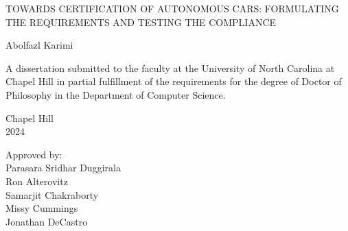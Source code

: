 \begin{titlepage}
\begin{center}


\vspace{2in}
\begin{singlespace}
    \MakeUppercase{Towards Certification of Autonomous Cars: formulating the requirements and testing the compliance}\\ %
\end{singlespace}


\vspace{61pt} %
Abolfazl Karimi
\end{center}



\vspace{39pt}
\begin{singlespace}
\noindent
\begin{center}
A dissertation submitted to the faculty at the University of North Carolina at Chapel Hill
in partial fulfillment of the requirements for the degree of Doctor of Philosophy in
the Department of Computer Science.
\end{center}
\end{singlespace}


\vspace{39pt}
\begin{center}
\begin{singlespace}
Chapel Hill\\
2024
\end{singlespace}
\end{center}


\vspace{39pt}
\begin{flushright}
\begin{minipage}[t]{1.8333 in}
Approved by:\\
Parasara Sridhar Duggirala\\
Ron Alterovitz\\
Samarjit Chakraborty\\
Missy Cummings\\
Jonathan DeCastro\\
\end{minipage}
\end{flushright}

\end{titlepage}

